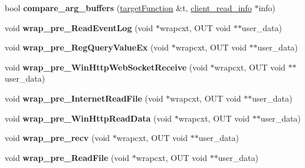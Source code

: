 \begin{DoxyCompactItemize}
\item 
\mbox{\label{class_s_l2_client_a95f95b67ef360559893fdc355c8d8195}} 
bool {\bfseries compare\+\_\+arg\+\_\+buffers} (\mbox{\hyperlink{structtarget_function}{target\+Function}} \&t, \mbox{\hyperlink{structclient__read__info}{client\+\_\+read\+\_\+info}} $\ast$info)
\item 
\mbox{\label{class_s_l2_client_a211a85db9e4357878acfdaafda3a6a5a}} 
void {\bfseries wrap\+\_\+pre\+\_\+\+Read\+Event\+Log} (void $\ast$wrapcxt, O\+UT void $\ast$$\ast$user\+\_\+data)
\item 
\mbox{\label{class_s_l2_client_a29d917879837e38f13cde9070ef219f6}} 
void {\bfseries wrap\+\_\+pre\+\_\+\+Reg\+Query\+Value\+Ex} (void $\ast$wrapcxt, O\+UT void $\ast$$\ast$user\+\_\+data)
\item 
\mbox{\label{class_s_l2_client_a9f096e927bdaebfda63863024cc5e8ed}} 
void {\bfseries wrap\+\_\+pre\+\_\+\+Win\+Http\+Web\+Socket\+Receive} (void $\ast$wrapcxt, O\+UT void $\ast$$\ast$user\+\_\+data)
\item 
\mbox{\label{class_s_l2_client_aa0dd6bf21908a40792103fdaef446d64}} 
void {\bfseries wrap\+\_\+pre\+\_\+\+Internet\+Read\+File} (void $\ast$wrapcxt, O\+UT void $\ast$$\ast$user\+\_\+data)
\item 
\mbox{\label{class_s_l2_client_acff3a789b34d2a07dde09a55d56bbe7a}} 
void {\bfseries wrap\+\_\+pre\+\_\+\+Win\+Http\+Read\+Data} (void $\ast$wrapcxt, O\+UT void $\ast$$\ast$user\+\_\+data)
\item 
\mbox{\label{class_s_l2_client_aa0018b0e2b79aa38ac915fb7d4d5aebc}} 
void {\bfseries wrap\+\_\+pre\+\_\+recv} (void $\ast$wrapcxt, O\+UT void $\ast$$\ast$user\+\_\+data)
\item 
\mbox{\label{class_s_l2_client_a6a882057f3b748fb6481a7f87b343ee3}} 
void {\bfseries wrap\+\_\+pre\+\_\+\+Read\+File} (void $\ast$wrapcxt, O\+UT void $\ast$$\ast$user\+\_\+data)
\item 
\mbox{\label{class_s_l2_client_a32093bc86e624033e16d5612f72ef43b}} 
$$
\end{DoxyCompactItemize}
